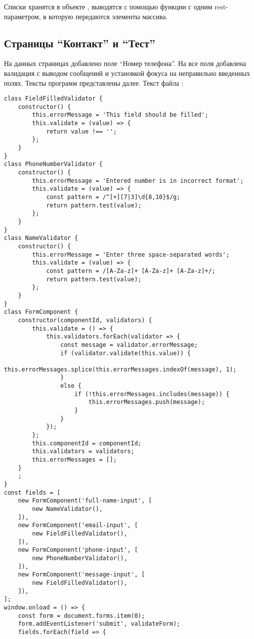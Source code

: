 \documentclass[a4paper,14pt]{extarticle}
\begin{document}
Списки хранятся в объекте , выводятся с помощью
функции с одним rest-параметром, в которую передаются элементы массива.

\subsection{Страницы \enquote{Контакт} и \enquote{Тест}}
На данных страницах добавлено поле \enquote{Номер телефона}. На все поля
добавлена валидация с выводом сообщений и установкой фокуса на
неправильно введенных полях. Тексты программ представлены далее.
Текст файла :
\begin{lstlisting}
class FieldFilledValidator {
    constructor() {
        this.errorMessage = 'This field should be filled';
        this.validate = (value) => {
            return value !== '';
        };
    }
}
class PhoneNumberValidator {
    constructor() {
        this.errorMessage = 'Entered number is in incorrect format';
        this.validate = (value) => {
            const pattern = /^[+][7|3]\d{8,10}$/g;
            return pattern.test(value);
        };
    }
}
class NameValidator {
    constructor() {
        this.errorMessage = 'Enter three space-separated words';
        this.validate = (value) => {
            const pattern = /[A-Za-z]+ [A-Za-z]+ [A-Za-z]+/;
            return pattern.test(value);
        };
    }
}
class FormComponent {
    constructor(componentId, validators) {
        this.validate = () => {
            this.validators.forEach(validator => {
                const message = validator.errorMessage;
                if (validator.validate(this.value)) {
                    this.errorMessages.splice(this.errorMessages.indexOf(message), 1);
                }
                else {
                    if (!this.errorMessages.includes(message)) {
                        this.errorMessages.push(message);
                    }
                }
            });
        };
        this.componentId = componentId;
        this.validators = validators;
        this.errorMessages = [];
    }
    ;
}
const fields = [
    new FormComponent('full-name-input', [
        new NameValidator(),
    ]),
    new FormComponent('email-input', [
        new FieldFilledValidator(),
    ]),
    new FormComponent('phone-input', [
        new PhoneNumberValidator(),
    ]),
    new FormComponent('message-input', [
        new FieldFilledValidator(),
    ]),
];
window.onload = () => {
    const form = document.forms.item(0);
    form.addEventListener('submit', validateForm);
    fields.forEach(field => {

\end{lstlisting}
\end{document}
